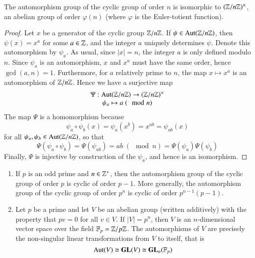 \begin{proposition}
    The automorphism group of the cyclic group of order $n$ is isomorphic to $(\mathbb Z/n\mathbb Z)^{\times}$, an abelian group of order $\varphi(n)$ (where $\varphi$ is the Euler-totient function).
\end{proposition}
\begin{proof}
    Let $x$ be a generator of the cyclic group $\mathbb Z/n\mathbb Z$. If $\psi \in \operatorname{Aut}(\mathbb Z/n\mathbb Z)$, then $\psi(x) = x^a$ for some $a \in \mathbb Z$, and the integer $a$ uniquely determines $\psi$. Denote this automorphism by $\psi_a$. As usual, since $|x| = n$, the integer $a$ is only defined modulo $n$. Since $\psi_a$ is an automorphism, $x$ and $x^a$ must have the same order, hence $\gcd(a,n) = 1$. Furthermore, for $a$ relatively prime to $n$, the map $x\mapsto x^a$ is an automorphism of $\mathbb Z/n\mathbb Z$. Hence we have a surjective map \begin{equation*}
        \begin{array}{c} \Psi:\operatorname{Aut}(\mathbb Z/n\mathbb Z)\rightarrow (\mathbb Z/n\mathbb Z)^{\times} \\ \psi_a\mapsto a\; (\mod n) \end{array}
    \end{equation*}
    The map $\Psi$ is a homomorphism because \begin{equation*}
        \psi_a\circ\psi_b(x) = \psi_a(x^b) = x^{ab} = \psi_{ab}(x)
    \end{equation*}
    for all $\psi_a,\psi_b \in \operatorname{Aut}(\mathbb Z/n\mathbb Z)$, so that \begin{equation*}
        \Psi(\psi_a\circ\psi_b) = \Psi(\psi_{ab}) = ab\;(\mod n) = \Psi(\psi_a)\Psi(\psi_b)
    \end{equation*}
    Finally, $\Psi$ is injective by construction of the $\psi_a$, and hence is an isomorphism.
\end{proof}


\begin{example}
    \leavevmode
    \begin{enumerate}
        \item If $p$ is an odd prime and $n \in \mathbb Z^+$, then the automorphism group of the cyclic group of order $p$ is cyclic of order $p-1$. More generally, the automorphism group of the cyclic group of order $p^n$ is cyclic of order $p^{n-1}(p-1)$.
        \item Let $p$ be a prime and let $V$ be an abelian group (written additively) with the property that $pv =0$ for all $v \in V$. If $|V| = p^n$, then $V$ is an $n$-dimensional vector space over the field $\mathbb F_p = \mathbb Z/p\mathbb Z$. The automorphisms of $V$ are precisely the non-singular linear transformations from $V$ to itself, that is \begin{equation*}
                \operatorname{Aut}(V) \cong \mathbf{GL}(V) \cong \mathbf{GL}_n(\mathbb F_p)
        \end{equation*}
    \end{enumerate}
\end{example}

